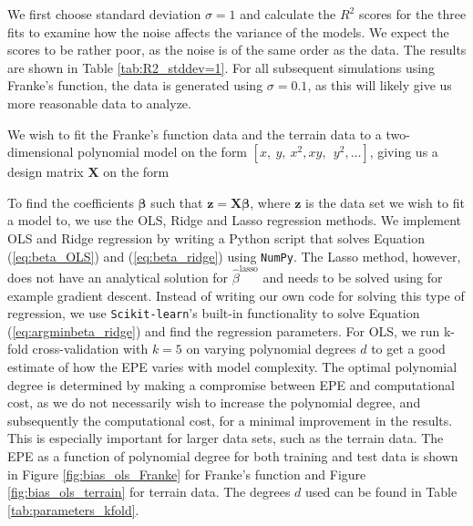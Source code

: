 \documentclass[a4paper, 10pt]{article}
\begin{document}
\begin{multicols}{2}
We first choose standard deviation $\sigma=1$ and calculate the $R^2$ scores for the three fits to examine how the noise affects the variance of the models. We expect the scores to be rather poor, as the noise is of the same order as the data.  The results are shown in Table \ref{tab:R2_stddev=1}. For all subsequent simulations using Franke's function, the data is generated using $\sigma=0.1$, as this will likely give us more reasonable data to analyze.

We wish to fit the Franke's function data and the terrain data to a two-dimensional polynomial model on the form $[x,\ y,\ x^2, xy,\ \ y^2, \dots]$,  giving us a design matrix $\bm{X}$ on the form \\

\setlength{\arraycolsep}{1.5pt}
\noindent
{}
\vspace{1pt}

\noindent
To find the coefficients $\bm{\beta}$ such that $\bm{ z} = \bm{X \beta} $, where $\bm{z}$ is the data set we wish to fit a model to, we use the OLS, Ridge and Lasso regression methods.
We implement OLS and Ridge regression by writing a Python script that solves Equation (\ref{eq:beta_OLS}) and (\ref{eq:beta_ridge}) using \texttt{NumPy}. The Lasso method, however, does not have an analytical solution for $\hat{\beta}^\text{lasso}$ and needs to be solved using for example gradient descent. Instead of writing our own code for solving this type of regression, we use \texttt{Scikit-learn}'s built-in functionality to solve Equation (\ref{eq:argminbeta_ridge}) and find the regression parameters.
\noindent
For OLS, we run k-fold cross-validation with $k=5$ on varying polynomial degrees $d$ to get a good estimate of how the EPE varies with model complexity. The optimal polynomial degree is determined by making a compromise between EPE and computational cost, as we do not necessarily wish to increase the polynomial degree, and subsequently the computational cost, for a minimal improvement in the results. This is especially important for larger data sets, such as the terrain data. The EPE as a function of polynomial degree for both training and test data is shown in Figure \ref{fig:bias_ols_Franke} for Franke's function and Figure \ref{fig:bias_ols_terrain} for terrain data. The degrees $d$ used can be found in Table \ref{tab:parameters_kfold}.


\end{multicols}
\end{document}
